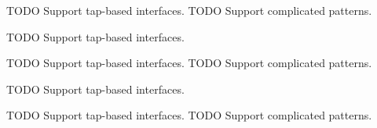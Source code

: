 \begin{DoxyRefList}
T\+O\+DO Support tap-\/based interfaces. T\+O\+DO Support complicated patterns.  
\item[\label{todo__todo000017}%
\Hypertarget{todo__todo000017}%
Member \hyperlink{route-tree_8c_a3a0eeaa4d6b227ed8aa19e5d56096cd3}{find\+\_\+node\+\_\+traverse} (G\+Node $\ast$node, gpointer data)]
\item[\label{todo__todo000005}%
\Hypertarget{todo__todo000005}%
Member \hyperlink{main_8c_a345bf2d3cf0cd82bcbbba3e054eafd48}{find\+\_\+primary\+\_\+if\+\_\+index} ()]T\+O\+DO Support tap-\/based interfaces. 
\item[\label{todo__todo000010}%
\Hypertarget{todo__todo000010}%
Member \hyperlink{route-tree_8c_ac750dd5c6890dd949d1029d4363fa0e0}{first\+\_\+entry\+\_\+cb} (struct nl\+\_\+object $\ast$obj, void $\ast$data)]T\+O\+DO Support tap-\/based interfaces. T\+O\+DO Support complicated patterns. 
\item[\label{todo__todo000006}%
\Hypertarget{todo__todo000006}%
Member \hyperlink{main_8c_a6f5d8c51479e6196fb3d19e3538a46d0}{get\+\_\+if\+\_\+info} (struct ifaddrs $\ast$ifa, int family, enum I\+F\+\_\+\+T\+R\+A\+V\+E\+R\+S\+E\+\_\+\+M\+O\+DE tr\+\_\+mode)]T\+O\+DO Support tap-\/based interfaces. 
\item[\label{todo__todo000025}%
\Hypertarget{todo__todo000025}%
Member \hyperlink{route-tree_8h_a77affcaa875961893c05c7e211678ed1}{get\+\_\+kernel\+\_\+route\+\_\+node} (G\+Node $\ast$kernel\+\_\+route\+\_\+roots\mbox{[}M\+A\+X\+\_\+\+R\+O\+O\+T\+S\+\_\+\+N\+U\+M\+B\+ER\mbox{]}, int roots, char $\ast$ifa\+\_\+name)]T\+O\+DO Support tap-\/based interfaces. T\+O\+DO Support complicated patterns.


\end{DoxyRefList}
